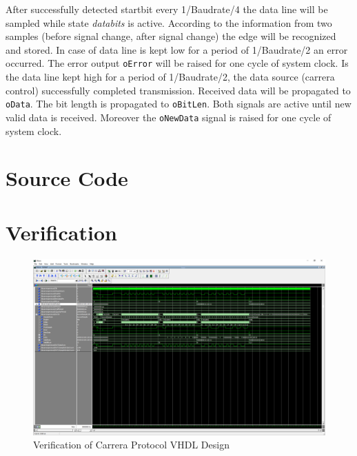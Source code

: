\documentclass {scrartcl}
\begin{document}
After successfully detected startbit every 1/Baudrate/4 the data line will be sampled while state \textit{databits} is active. According to the information from two samples (before signal change, after signal change) the edge will be recognized and stored. In case of data line is kept low for a period of 1/Baudrate/2 an error occurred. The error output \texttt{oError} will be raised for one cycle of system clock.
Is the data line kept high for a period of 1/Baudrate/2, the data source (carrera control) successfully completed transmission. Received data will be propagated to \texttt{oData}. The bit length is propagated to \texttt{oBitLen}. Both signals are active until new valid data is received. Moreover the \texttt{oNewData} signal is raised for one cycle of system clock.


\section{Source Code}



\section{Verification}
\begin{figure}[h]
	\centering
		\includegraphics[angle=90,height=1.00\textheight]{./Verification.png}
	\caption{Verification of Carrera Protocol VHDL Design}
	\label{fig:Verification}
\end{figure}





\end{document}
